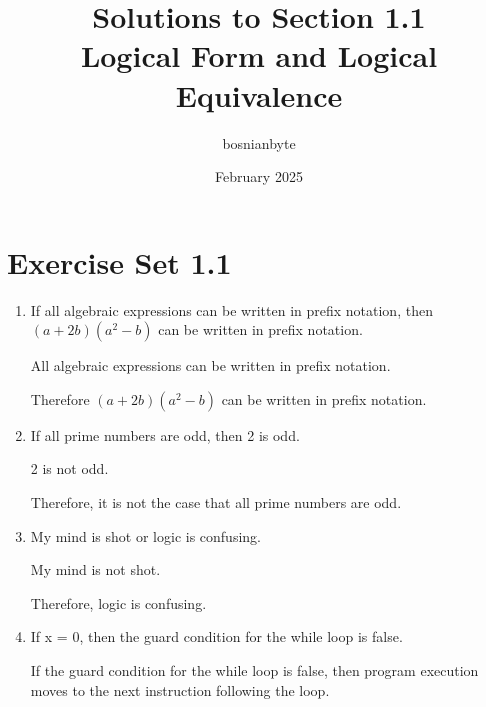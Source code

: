\documentclass{article}
\title{Solutions to Section 1.1 \\ Logical Form and Logical Equivalence}
\author{bosnianbyte}
\date{February 2025}
\begin{document}
\maketitle

\section{Exercise Set 1.1}

\begin{enumerate}[label=\textbf{\arabic*.}]
\item %
If all algebraic expressions can be written in prefix notation, then $(a + 2b)(a^2 - b)$ can be written in prefix notation.

All algebraic expressions can be written in prefix notation.

Therefore $(a + 2b)(a^2 - b)$ can be written in prefix notation.
\item %
If all prime numbers are odd, then 2 is odd.

2 is not odd.

Therefore, it is not the case that all prime numbers are odd.
\item %
My mind is shot or logic is confusing.

My mind is not shot.

Therefore, logic is confusing.
\item %
If x = 0, then the guard condition for the while loop is false.

If the guard condition for the while loop is false, then program execution moves to the next instruction following the loop.


\end{enumerate}
\end{document}
